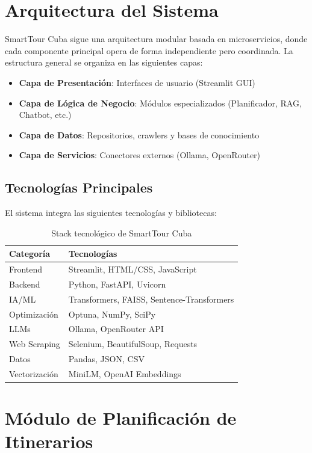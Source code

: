 \documentclass[runningheads]{llncs}
\begin{document}
\section{Arquitectura del Sistema}

SmartTour Cuba sigue una arquitectura modular basada en microservicios, donde cada componente principal opera de forma independiente pero coordinada. La estructura general se organiza en las siguientes capas:

\begin{itemize}
\item \textbf{Capa de Presentación}: Interfaces de usuario (Streamlit GUI)
\item \textbf{Capa de Lógica de Negocio}: Módulos especializados (Planificador, RAG, Chatbot, etc.)
\item \textbf{Capa de Datos}: Repositorios, crawlers y bases de conocimiento
\item \textbf{Capa de Servicios}: Conectores externos (Ollama, OpenRouter)
\end{itemize}

\subsection{Tecnologías Principales}

El sistema integra las siguientes tecnologías y bibliotecas:

\begin{table}[H]
\centering
\begin{tabular}{ll}
\toprule
\textbf{Categoría} & \textbf{Tecnologías} \\
\midrule
Frontend & Streamlit, HTML/CSS, JavaScript \\
Backend & Python, FastAPI, Uvicorn \\
IA/ML & Transformers, FAISS, Sentence-Transformers \\
Optimización & Optuna, NumPy, SciPy \\
LLMs & Ollama, OpenRouter API \\
Web Scraping & Selenium, BeautifulSoup, Requests \\
Datos & Pandas, JSON, CSV \\
Vectorización & MiniLM, OpenAI Embeddings \\
\bottomrule
\end{tabular}
\caption{Stack tecnológico de SmartTour Cuba}
\end{table}

\section{Módulo de Planificación de Itinerarios}
\end{document}
